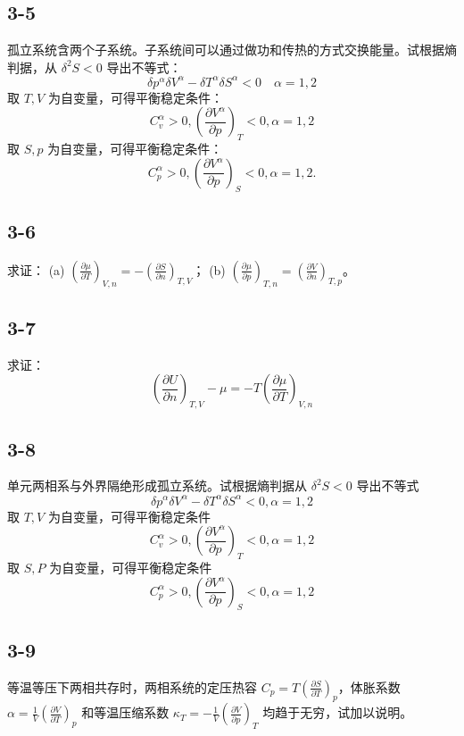 \newpage
\subsection{3-5}
孤立系统含两个子系统。子系统间可以通过做功和传热的方式交换能量。试根据熵判据，从 $\delta^2S<0$ 导出不等式：
$$ \delta p^\alpha \delta V^\alpha - \delta T^\alpha \delta S^\alpha < 0 \quad \alpha = 1, 2 $$
取 $T, V$ 为自变量，可得平衡稳定条件：
$$ C_{v}^\alpha > 0, \left( \frac{\partial V^\alpha}{\partial p} \right)_T < 0, \alpha = 1, 2 $$
取 $S, p$ 为自变量，可得平衡稳定条件：
$$ C_{p}^\alpha > 0, \left( \frac{\partial V^\alpha}{\partial p} \right)_S < 0, \alpha = 1, 2. $$

\newpage
\subsection{3-6}
求证：
(a) $\left( \frac{\partial \mu}{\partial T} \right)_{V,n} = - \left( \frac{\partial S}{\partial n} \right)_{T,V}$；
(b) $\left( \frac{\partial \mu}{\partial p} \right)_{T,n} = \left( \frac{\partial V}{\partial n} \right)_{T,p}$。

\newpage
\subsection{3-7}
求证：
$$ \left( \frac{\partial U}{\partial n} \right)_{T,V} - \mu = -T \left( \frac{\partial \mu}{\partial T} \right)_{V,n} $$

\newpage
\subsection{3-8}
单元两相系与外界隔绝形成孤立系统。试根据熵判据从 $\delta^2 S < 0$ 导出不等式
$$ \delta p^\alpha \delta V^\alpha - \delta T^\alpha \delta S^\alpha < 0, \alpha = 1, 2 $$
取 $T, V$ 为自变量，可得平衡稳定条件
$$ C_v^\alpha > 0, \left( \frac{\partial V^\alpha}{\partial p} \right)_{T} < 0, \alpha = 1, 2 $$
取 $S, P$ 为自变量，可得平衡稳定条件
$$ C_p^\alpha > 0, \left( \frac{\partial V^\alpha}{\partial p} \right)_{S} < 0, \alpha = 1, 2 $$

\newpage
\subsection{3-9}
等温等压下两相共存时，两相系统的定压热容 $C_p = T \left( \frac{\partial S}{\partial T} \right)_p$，体胀系数 $\alpha = \frac{1}{V} \left( \frac{\partial V}{\partial T} \right)_p$ 和等温压缩系数 $\kappa_T = -\frac{1}{V} \left( \frac{\partial V}{\partial p} \right)_T$ 均趋于无穷，试加以说明。

